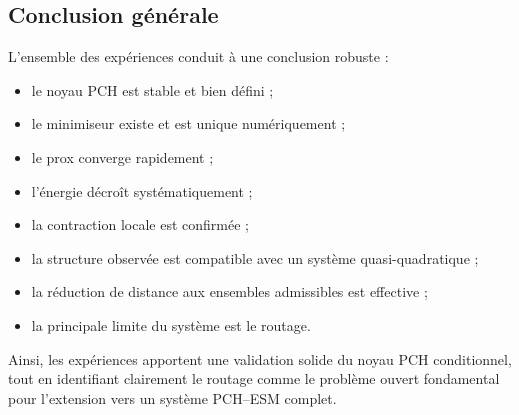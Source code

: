 \documentclass[11pt,a4paper]{article}
\newcommand{\1}{\mathbf 1}
\begin{document}
\subsection{Conclusion générale}

L’ensemble des expériences conduit à une conclusion robuste :

\begin{itemize}
\item le noyau PCH est stable et bien défini ;
\item le minimiseur existe et est unique numériquement ;
\item le prox converge rapidement ;
\item l’énergie décroît systématiquement ;
\item la contraction locale est confirmée ;
\item la structure observée est compatible avec un système quasi-quadratique ;
\item la réduction de distance aux ensembles admissibles est effective ;
\item la principale limite du système est le routage.
\end{itemize}

Ainsi, les expériences apportent une validation solide du noyau PCH conditionnel, tout en identifiant clairement le routage comme le problème ouvert fondamental pour l’extension vers un système PCH--ESM complet.
\end{document}
